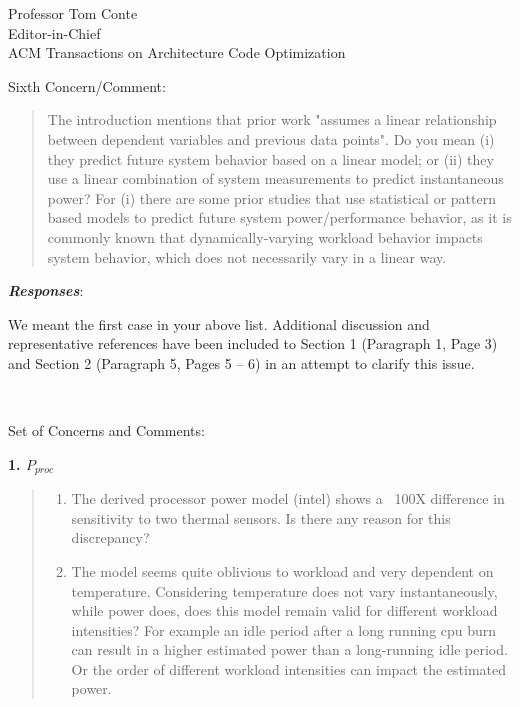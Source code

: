 \documentclass[10pt]{letter} %
\newenvironment{rviewcomment}
{~\\%
\begin{bfseries}}
{\end{bfseries}}
\newcommand{\rviewresponses}{\textbf{\textit{Responses}}:}
\begin{document}
\begin{letter}{Professor Tom Conte \\
Editor-in-Chief \\
ACM Transactions on Architecture Code Optimization }
\begin{rviewcomment}
  Sixth Concern/Comment:
\end{rviewcomment}
\begin{quote}
  \begin{itshape}
    The introduction mentions that prior work "assumes a linear
    relationship between dependent variables and previous data
    points". Do you mean (i) they predict future system behavior based
    on a linear model; or (ii) they use a linear combination of system
    measurements to predict instantaneous power?  For (i) there are some
    prior studies that use statistical or pattern based models to
    predict future system power/performance behavior, as it is commonly
    known that dynamically-varying workload behavior impacts system
    behavior, which does not necessarily vary in a linear way.
  \end{itshape}
\end{quote}

\rviewresponses

We meant the first case in your above list.  Additional discussion and
representative references have been included to Section 1 (Paragraph 1,
Page 3) and Section 2 (Paragraph 5, Pages 5 -- 6) in an attempt to
clarify this issue.

\begin{rviewcomment}
  Set of Concerns and Comments:
\end{rviewcomment}

\textbf{1. $P_{proc}$}
\label{sec-3-6-1}
\begin{quote}
\begin{itshape}
\begin{enumerate}
\item  The derived processor power model (intel) shows a ~100X difference in
       sensitivity to two thermal sensors. Is there any reason for this
       discrepancy? 
\item The model seems quite oblivious to workload and very dependent on
       temperature. Considering temperature does not vary instantaneously,
       while power does, does this model remain valid for different workload
       intensities? For example an idle period after a long running cpu burn
       can result in a higher estimated power than a long-running idle
       period. Or the order of different workload intensities can impact the
       estimated power.
\end{enumerate}
\end{itshape}
\end{quote}


\end{letter}
\end{document}
